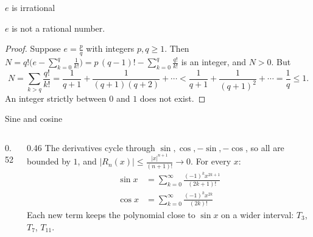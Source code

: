 \documentclass[10pt]{wosm-slides}
\begin{document}
\begin{frame}{$e$ is irrational}
  \begin{theorem}
    $e$ is not a rational number.
  \end{theorem}
  \begin{proof}
    Suppose $e = \frac pq$ with integers $p, q \ge 1$. Then
    $N = q! \bigl( e - \sum_{k=0}^{q} \frac{1}{k!} \bigr) = p\,(q-1)! - \sum_{k=0}^{q} \frac{q!}{k!}$
    is an integer, and $N > 0$. But
    \[ N = \sum_{k > q} \frac{q!}{k!} = \frac{1}{q+1} + \frac{1}{(q+1)(q+2)} + \cdots
       < \frac{1}{q+1} + \frac{1}{(q+1)^2} + \cdots = \frac1q \le 1 . \]
    An integer strictly between $0$ and $1$ does not exist.
  \end{proof}
\end{frame}

\begin{frame}{Sine and cosine}
  \begin{columns}[c]
    \begin{column}{0.52\textwidth}
    \end{column}
    \begin{column}{0.46\textwidth}
      \small
      The derivatives cycle through $\sin, \cos, -\sin, -\cos$, so all are bounded by $1$, and
      $|R_n(x)| \le \frac{|x|^{n+1}}{(n+1)!} \to 0$. For every $x$:
      \begin{align*}
        \sin x &= \sum_{k=0}^\infty \frac{(-1)^k x^{2k+1}}{(2k+1)!} \\
        \cos x &= \sum_{k=0}^\infty \frac{(-1)^k x^{2k}}{(2k)!}
      \end{align*}
      Each new term keeps the polynomial close to $\sin x$ on a wider interval:
      {\color{wosm-brick!50!wosm-bg}$T_3$}, {\color{wosm-brick!80!wosm-bg}$T_7$},
      {\color{wosm-accent}$T_{11}$}.
    \end{column}
  \end{columns}
\end{frame}
\end{document}
